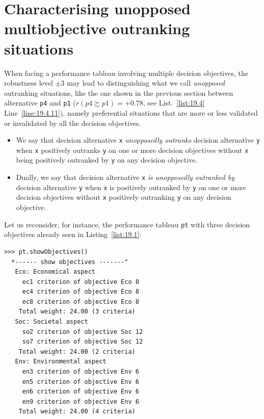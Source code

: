 \section{Characterising unopposed multiobjective outranking situations}
\label{sec:19.5}

When facing a performance tableau involving multiple decision objectives, the robustness level $\pm 3$  may lead to distinguishing what we call \emph{unopposed} outranking situations, like the one shown in the previous section between alternative \texttt{p4} and \texttt{p1} ($r(p4 \succsim p1) = +0.78$, see List.~\vref{list:19.4} Line~\ref{line:19.4.11}), namely preferential situations that are more or less validated or invalidated by all the decision objectives.  

\begin{definition}\label{def:19.2}
\begin{itemize}
\item We say that decision alternative \texttt{x} \emph{unopposedly outranks} decision alternative \texttt{y} when  \texttt{x} positively outranks \texttt{y} on one or more decision objectives without \texttt{x} being positively outranked by \texttt{y} on any decision objective.
\item Dually, we say that decision alternative \texttt{x} \emph{is unopposedly outranked by} decision alternative \texttt{y} when \texttt{x} is positively outranked by \texttt{y} on one or more decision objectives without \texttt{x} positively outranking \texttt{y} on any decision objective.
\end{itemize}
\end{definition}

Let us reconsider, for instance, the performance tableau \texttt{pt} with three decision objectives already seen in Listing~\vref{list:19.1}:
\begin{lstlisting}
>>> pt.showObjectives()
  *------ show objectives -------"
   Eco: Economical aspect
     ec1 criterion of objective Eco 8
     ec4 criterion of objective Eco 8
     ec8 criterion of objective Eco 8
    Total weight: 24.00 (3 criteria)
   Soc: Societal aspect
     so2 criterion of objective Soc 12
     so7 criterion of objective Soc 12
    Total weight: 24.00 (2 criteria)
   Env: Environmental aspect
     en3 criterion of objective Env 6
     en5 criterion of objective Env 6
     en6 criterion of objective Env 6
     en9 criterion of objective Env 6
    Total weight: 24.00 (4 criteria)
\end{lstlisting}

